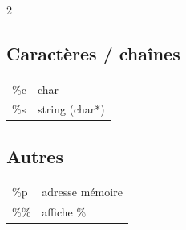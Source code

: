 \documentclass[8pt]{article}
\begin{document}
\begin{multicols}{2}
\subsection{Caractères / chaînes}

\begin{tabular}{ll}
\%c & char \\
\%s & string (char*) \\
\end{tabular}

\subsection{Autres}

\begin{tabular}{ll}
\%p & adresse mémoire \\
\%\% & affiche \% \\
\end{tabular}

\end{multicols}
\end{document}
